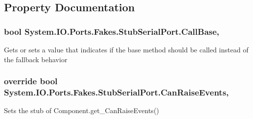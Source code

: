 \subsection{Property Documentation}
\hypertarget{class_system_1_1_i_o_1_1_ports_1_1_fakes_1_1_stub_serial_port_a7a3902b71cbfcd37b50fa43ccd1296b6}{
\subsubsection[{Call\-Base}]{\setlength{\rightskip}{0pt plus 5cm}bool System.\-I\-O.\-Ports.\-Fakes.\-Stub\-Serial\-Port.\-Call\-Base\hspace{0.3cm}{\ttfamily [get]}, {\ttfamily [set]}}}\label{class_system_1_1_i_o_1_1_ports_1_1_fakes_1_1_stub_serial_port_a7a3902b71cbfcd37b50fa43ccd1296b6}


Gets or sets a value that indicates if the base method should be called instead of the fallback behavior

\hypertarget{class_system_1_1_i_o_1_1_ports_1_1_fakes_1_1_stub_serial_port_a7371621bad4517ddb462377eb6e40e83}{
\subsubsection[{Can\-Raise\-Events}]{\setlength{\rightskip}{0pt plus 5cm}override bool System.\-I\-O.\-Ports.\-Fakes.\-Stub\-Serial\-Port.\-Can\-Raise\-Events\hspace{0.3cm}{\ttfamily [get]}, {\ttfamily [protected]}}}\label{class_system_1_1_i_o_1_1_ports_1_1_fakes_1_1_stub_serial_port_a7371621bad4517ddb462377eb6e40e83}


Sets the stub of Component.\-get\-\_\-\-Can\-Raise\-Events()

